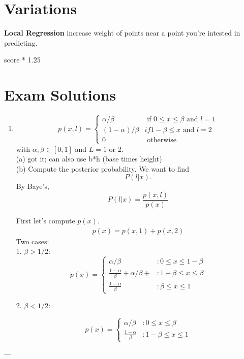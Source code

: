 \documentclass[12pt]{article}
\newcommand{\bt}[1]{\textbf{#1}} %
\newcommand{\eq}[1]{\begin{align*}#1\end{align*}} %
\renewcommand{\eq}[1]{\begin{align*}#1\end{align*}} %
\begin{document}
\section*{Variations}

\bt{Local Regression} increase weight of points near a point you're intested in predicting.

score * 1.25 

\section*{Exam Solutions}

\begin{enumerate}
    \item 
 \begin{displaymath}
   p(x, l) = \left\{
     \begin{array}{lr}
       \alpha / \beta & \text{ if } 0 \leq x \leq \beta \text{ and } l = 1\\
       (1 - \alpha) /\beta & if 1 - \beta \leq x \text{ and } l = 2 \\
       0 & \text{ otherwise}
     \end{array}
   \right.
   \end{displaymath}
   with $\alpha, \beta \in [0, 1]$ and $L = 1$ or 2.\\
   (a) got it; can also use b*h (base times height)\\
   (b) Compute the posterior probability.
   We want to find 
   $$P(l | x).$$
   By Baye's, 
   $$P(l | x) = \frac{p(x, l)}{p(x)}$$

   First let's compute $p(x)$. 
   \eq{ p(x) = p(x, 1) + p(x, 2)}
   Two cases: \\
   1. $\beta > 1/2$: \\
 \begin{displaymath}
     p(x) = \left\{
     \begin{array}{lr}
        \alpha / \beta & :  0 \leq x \leq 1 - \beta \\
        \frac{1 - \alpha}{\beta} + \alpha / \beta  + & : 1 - \beta \leq x \leq \beta \\
       \frac{1 - \alpha}{\beta} & : \beta \leq x \leq 1
        
     \end{array}
   \right.
   \end{displaymath}
        
   2. $\beta < 1/2$: 

\begin{displaymath}
     p(x) = \left\{
     \begin{array}{lr}
        \alpha / \beta & :  0 \leq x \leq \beta \\
       \frac{1 - \alpha}{\beta} & : 1 - \beta \leq x \leq 1
     \end{array}
   \right.
   \end{displaymath}


\end{enumerate}
 ---
\end{document}

